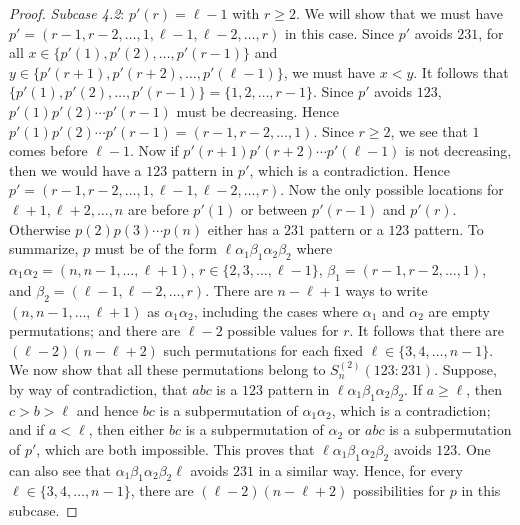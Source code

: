 \documentclass[11pt]{article}
\theoremstyle{definition}
\numberwithin{equation}{section}
\begin{document}
\begin{proof}
    {\it Subcase 4.2}: $p'(r)=\ell-1$ with $r\geq2$. We will show that we must have $p'=(r-1,r-2,\ldots,1,\ell-1,\ell-2,\ldots,r)$ in this case. Since $p'$ avoids $231$, for all $x\in\{p'(1),p'(2),\ldots,p'(r-1)\}$ and $y\in \{p'(r+1),p'(r+2),\ldots,p'(\ell-1)\}$, we must have $x<y$. 
It follows that $\{p'(1),p'(2),\ldots,p'(r-1)\}=\{1,2,\ldots,r-1\}$. Since $p'$ avoids $123$, $p'(1)p'(2)\cdots p'(r-1)$ must be decreasing.  
Hence $p'(1)p'(2)\cdots p'(r-1)=(r-1,r-2,\ldots,1)$. Since $r\geq2$, we see that $1$ comes before $\ell-1$. Now if $p'(r+1)p'(r+2)\cdots p'(\ell-1)$ is not decreasing, then we would have a $123$ pattern in $p'$, which is a contradiction. Hence $p'=(r-1,r-2,\ldots,1,\ell-1,\ell-2,\ldots,r)$. Now the only possible locations for $\ell+1,\ell+2,\ldots,n$ are before $p'(1)$ or between $p'(r-1)$ and $p'(r)$. 
Otherwise $p(2)p(3)\cdots p(n)$ either has a $231$ pattern or a $123$ pattern. To summarize, $p$ must be of the form $\ell\alpha_1\beta_1\alpha_2\beta_2$ where $\alpha_1\alpha_2=(n,n-1,\ldots,\ell+1)$, $r\in\{2,3,\ldots,\ell-1\}$, $\beta_1=(r-1,r-2,\ldots,1)$, and $\beta_2=(\ell-1,\ell-2,\ldots,r)$. There are $n-\ell+1$ ways to write $(n,n-1,\ldots,\ell+1)$ as $\alpha_1\alpha_2$, including the cases where $\alpha_1$ and $\alpha_2$ are empty permutations; and there are $\ell-2$ possible values for $r$. It follows that there are $(\ell-2)(n-\ell+2)$ such permutations for each fixed $\ell\in\{3,4,\ldots,n-1\}$. We now show that all these permutations belong to $S_n^{(2)}(123:231)$. 
Suppose, by way of contradiction, that $abc$ is a $123$ pattern in $\ell\alpha_1\beta_1\alpha_2\beta_2$. If $a\geq\ell$, then $c>b>\ell$ and hence $bc$ is a subpermutation of $\alpha_1\alpha_2$, which is a contradiction; and if $a<\ell$, then either $bc$ is a subpermutation of $\alpha_2$ or $abc$ is a subpermutation of $p'$, which are both impossible. This proves that $\ell\alpha_1\beta_1\alpha_2\beta_2$ avoids $123$. One can also see that $\alpha_1\beta_1\alpha_2\beta_2\ell$ avoids $231$ in a similar way. Hence, for every $\ell\in\{3,4,\ldots,n-1\}$, there are $(\ell-2)(n-\ell+2)$ possibilities for $p$ in this subcase.



\end{proof}
\end{document}
